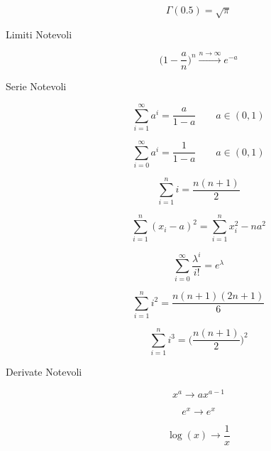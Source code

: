 \begin{description}
		\begin{equation}
		\Gamma(0.5) = \sqrt{\pi}
		\end{equation}
	
	\item[Limiti Notevoli]
		\begin{equation}
		\Bigg(1-\frac{a}{n}\Bigg)^{n} \overset{n\rightarrow\infty}{\rightarrow} e^{-a}
		\end{equation}
	
	\item[Serie Notevoli]
		\begin{equation}
		\sum_{i=1}^{\infty} a^{i} = \frac{a}{1-a} \qquad a\in(0,1)
		\end{equation}
		
		\begin{equation}
		\sum_{i=0}^{\infty} a^{i} = \frac{1}{1-a} \qquad a\in(0,1)
		\end{equation}
		
		\begin{equation}
		\sum_{i=1}^{n} i = \frac{n(n+1)}{2}
		\end{equation}
		
		\begin{equation}
		\sum_{i=1}^{n} (x_{i}-a)^{2} = 	\sum_{i=1}^{n} x_{i}^{2}-na^{2}
		\end{equation}
		
		\begin{equation}
		\sum_{i=0}^{\infty} \frac{\lambda^{i}}{i!} = e^{\lambda}
		\end{equation}
		
		\begin{equation}
		\sum_{i=1}^{n} i^{2} = \frac{n(n+1)(2n+1)}{6}
		\end{equation}
		
		\begin{equation}
		\sum_{i=1}^{n} i^{3} = \Bigg(\frac{n(n+1)}{2}\Bigg)^{2}
		\end{equation}
	
	\item[Derivate Notevoli]
		\begin{equation}
		x^{a} \rightarrow ax^{a-1}
		\end{equation}
		
		\begin{equation}
		e^{x} \rightarrow e^{x}
		\end{equation}
		
		\begin{equation}
		\log(x) \rightarrow \frac{1}{x}
		\end{equation}
		

\end{description}
